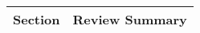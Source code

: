 
\begin{table*}[t!]
\centering
\footnotesize
\renewcommand{\arraystretch}{1.5} %
\begin{adjustbox}{width=\textwidth}
\begin{tabular}{m{3cm} m{13cm}} %
\toprule
\textbf{Section} & \textbf{Review Summary}\\
\midrule


\end{tabular}
\end{adjustbox}
\end{table*}
